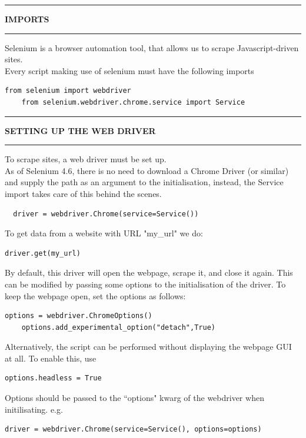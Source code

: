 \documentclass[8pt]{extarticle}
\newcommand{\heading}[1]{%
    \noindent
    \rule{\linewidth}{0.4pt}
    \begin{center}
        \vspace{-1ex}
        \textbf{#1}        
        \vspace{-2.5ex}
    \end{center}
    \rule{\linewidth}{0.4pt}
}
\begin{document}
\begin{multicols}{3}
\heading{IMPORTS}

Selenium is a browser automation tool, that allows us to scrape Javascript-driven sites. \\

Every script making use of selenium must have the following imports

\begin{lstlisting}[style=python]   
    from selenium import webdriver
    from selenium.webdriver.chrome.service import Service
\end{lstlisting}

\columnbreak
\heading{SETTING UP THE WEB DRIVER}

To scrape sites, a web driver must be set up. \\

As of Selenium 4.6, there is no need to download a Chrome Driver (or similar) and supply the path as an argument to the initialisation, instead, the Service import takes care of this behind the scenes.

\begin{lstlisting} 
  driver = webdriver.Chrome(service=Service())
\end{lstlisting}

To get data from a website with URL "my\_url" we do:

\begin{lstlisting}[style=python] 
    driver.get(my_url)
\end{lstlisting}

By default, this driver will open the webpage, scrape it, and close it again. This can be modified by passing some options to the initialisation of the driver. To keep the webpage open, set the options as follows:

\begin{lstlisting}[style=python]   
    options = webdriver.ChromeOptions()
    options.add_experimental_option("detach",True)
\end{lstlisting}

Alternatively, the script can be performed without displaying the webpage GUI at all. To enable this, use 
\begin{lstlisting}[style=python]            
    options.headless = True
\end{lstlisting}

Options should be passed to the ``options" kwarg of the webdriver when initilisating. e.g. 

\begin{lstlisting}[style=python] 
    driver = webdriver.Chrome(service=Service(), options=options)
\end{lstlisting}


\end{multicols}
\end{document}
